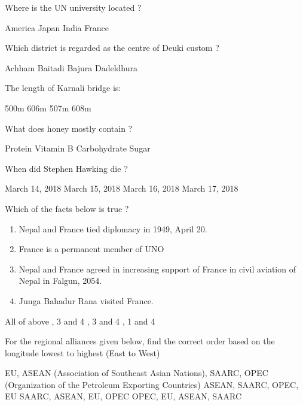 \begin{questions}
\question Where is the UN university located ?
  \begin{choices}
  \choice America
  \choice Japan
  \CorrectChoice India
  \choice France
  \end{choices}

\question Which district is regarded as the centre of Deuki custom ?
  \begin{choices}
  \choice Achham
  \CorrectChoice Baitadi
  \choice Bajura
  \choice Dadeldhura
  \end{choices}

\question The length of Karnali bridge is:
  \begin{choices}
  \CorrectChoice 500m
  \choice 606m
  \choice 507m
  \choice 608m
  \end{choices}

\question What does honey mostly contain ?
  \begin{choices}
  \choice Protein
  \choice Vitamin B
  \CorrectChoice Carbohydrate
  \choice Sugar
  \end{choices}

\question When did Stephen Hawking die ?
  \begin{choices}
  \CorrectChoice March 14, 2018
  \choice March 15, 2018
  \choice March 16, 2018
  \choice March 17, 2018
  \end{choices}

\question Which of the facts below is true ?
  \begin{enumerate}
  \item Nepal and France tied diplomacy in 1949, April 20.
  \item France is a permanent member of UNO
  \item Nepal and France agreed in increasing support of France in civil aviation of Nepal in Falgun, 2054.
  \item Junga Bahadur Rana visited France.
  \end{enumerate}
  \begin{choices}
  \CorrectChoice All of above
  , 3 and 4
  , 3 and 4
  , 1 and 4
  \end{choices}

\question For the regional alliances given below, find the correct order based on the longitude lowest to highest (East to West)
  \begin{choices}
  \choice EU, ASEAN (Association of Southeast Asian Nations), SAARC, OPEC (Organization of the Petroleum Exporting Countries)
  \CorrectChoice ASEAN, SAARC, OPEC, EU
  \choice SAARC, ASEAN, EU, OPEC
  \choice OPEC, EU, ASEAN, SAARC
  \end{choices}


\end{questions}
